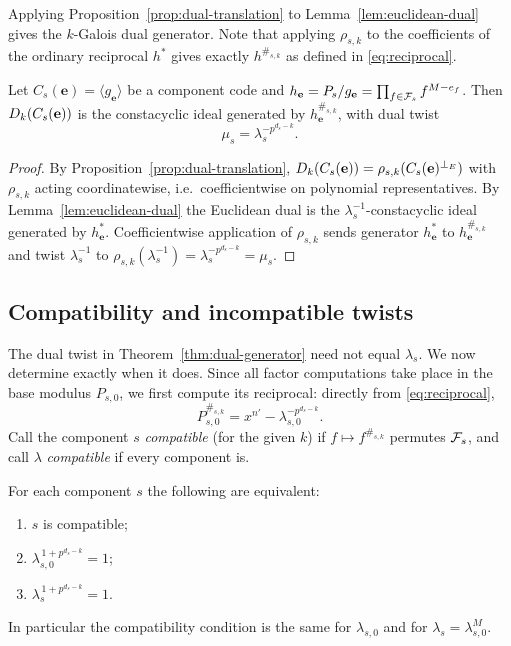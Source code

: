 Applying Proposition~\ref{prop:dual-translation} to
Lemma~\ref{lem:euclidean-dual} gives the $k$-Galois dual generator.  Note that
applying $\rho_{s,k}$ to the coefficients of the ordinary reciprocal $h^\ast$
gives exactly $h^{\#_{s,k}}$ as defined in \eqref{eq:reciprocal}.

\begin{theorem}\label{thm:dual-generator}
Let $C_s(\mathbf{e})=\langle g_{\mathbf{e}}\rangle$ be a component code and
$h_{\mathbf{e}}=P_s/g_{\mathbf{e}}=\prod_{f\in\mathcal F_s}f^{M-e_f}$.  Then
$D_k(C_s(\mathbf{e}))$ is the constacyclic ideal generated by
$h_{\mathbf{e}}^{\#_{s,k}}$, with dual twist
\[
\mu_s=\lambda_s^{-p^{d_s-k}}.
\]
\end{theorem}

\begin{proof}
By Proposition~\ref{prop:dual-translation},
$D_k(C_s(\mathbf{e}))=\rho_{s,k}(C_s(\mathbf{e})^{\perp_{E}})$ with $\rho_{s,k}$
acting coordinatewise, i.e.\ coefficientwise on polynomial representatives.
By Lemma~\ref{lem:euclidean-dual} the Euclidean dual is the
$\lambda_s^{-1}$-constacyclic ideal generated by $h_{\mathbf{e}}^\ast$.
Coefficientwise application of $\rho_{s,k}$ sends generator
$h_{\mathbf{e}}^\ast$ to $h_{\mathbf{e}}^{\#_{s,k}}$ and twist $\lambda_s^{-1}$
to $\rho_{s,k}(\lambda_s^{-1})=\lambda_s^{-p^{d_s-k}}=\mu_s$.
\end{proof}

\subsection{Compatibility and incompatible twists}\label{sec:compatibility}

The dual twist in Theorem~\ref{thm:dual-generator} need not equal $\lambda_s$.
We now determine exactly when it does.  Since all factor computations take place
in the base modulus $P_{s,0}$, we first compute its reciprocal: directly from
\eqref{eq:reciprocal},
\begin{equation}\label{eq:base-reciprocal}
P_{s,0}^{\#_{s,k}}
   =x^{n'}-\lambda_{s,0}^{-p^{d_s-k}}.
\end{equation}
Call the component $s$ \emph{compatible} (for the given $k$) if
$f\mapsto f^{\#_{s,k}}$ permutes $\mathcal F_s$, and call $\lambda$ \emph{compatible} if
every component is.

\begin{proposition}\label{prop:compatibility}
For each component $s$ the following are equivalent:
\begin{enumerate}
\item[\textup{(i)}] $s$ is compatible;
\item[\textup{(ii)}] $\lambda_{s,0}^{\,1+p^{d_s-k}}=1$;
\item[\textup{(iii)}] $\lambda_s^{\,1+p^{d_s-k}}=1$.
\end{enumerate}
In particular the compatibility condition is the same for $\lambda_{s,0}$ and
for $\lambda_s=\lambda_{s,0}^M$.
\end{proposition}

